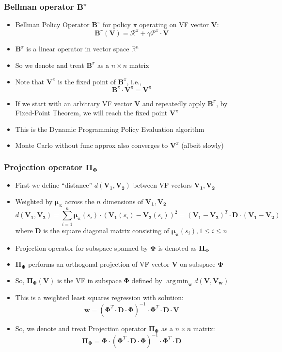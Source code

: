 \documentclass[handout]{beamer}
\newcommand{\vw}{\bm{V_w}}
\newcommand{\vpi}{\bm{V}^{\pi}}
\newcommand{\bphi}{\bm{\Phi}}
\newcommand{\bb}{\bm{B}^{\pi}}
\newcommand{\bpi}{\bm{\Pi_{\Phi}}}
\newcommand{\bmu}{\bm{\mu_{\pi}}}
\newcommand{\bv}{\bm{V}}
\newcommand{\bd}{\bm{D}}
\newcommand{\bw}{\bm{w}}
\DeclareMathOperator*{\argmin}{arg\,min}
\begin{document}
\begin{frame}
\frametitle{Bellman operator $\bb$}
\pause
\begin{itemize}[<+->]
\item Bellman Policy Operator $\bb$ for policy $\pi$ operating on VF vector $\bv$:
$$\bb (\bv) = \bm{\mathcal{R}}^{\pi} + \gamma \bm{\mathcal{P}}^{\pi} \cdot \bv$$
\item $\bb$ is a linear operator in vector space $\mathbb{R}^n$
\item So we denote and treat $\bb$ as a $n \times n$ matrix
\item Note that $\vpi$ is the fixed point of $\bb$, i.e.,
$$\bb \cdot \vpi = \vpi$$
\item If we start with an arbitrary VF vector $\bv$ and repeatedly apply $\bb$, 
by Fixed-Point Theorem, we will reach the fixed point $\vpi$
\item This is the Dynamic Programming Policy Evaluation algorithm
\item Monte Carlo without func approx also converges to $\vpi$ (albeit slowly)
\end{itemize}
\end{frame}

\begin{frame}
\frametitle{Projection operator $\bpi$}
\pause
\begin{itemize}[<+->]
\item First we define ``distance'' $d(\bm{V_1}, \bm{V_2})$ between VF vectors $\bm{V_1}, \bm{V_2}$
\item Weighted by $\bmu$ across the $n$ dimensions of $\bm{V_1}, \bm{V_2}$
$$d(\bm{V_1}, \bm{V_2}) = \sum_{i=1}^n \bmu(s_i) \cdot  (\bm{V_1}(s_i) - \bm{V_2}(s_i))^2 =  (\bm{V_1} - \bm{V_2})^T \cdot \bd \cdot (\bm{V_1} - \bm{V_2})$$
where $\bd$ is the square diagonal matrix consisting of $\bmu(s_i), 1 \leq i \leq n$
\item Projection operator for subspace spanned by $\bphi$ is denoted as $\bpi$
\item $\bpi$ performs an orthogonal projection of VF vector $\bv$ on subspace $\bphi$
\item So, $\bpi (\bv)$ is the VF in subspace $\bphi$ defined by $\argmin_{\bw} d(\bv, \vw)$
\item This is a weighted least squares regression with solution:
$$\bw = (\bphi^T \cdot \bd \cdot \bphi)^{-1} \cdot \bphi^T \cdot \bd \cdot \bv$$
\item So, we denote and treat Projection operator $\bpi$ as a $n \times n$ matrix:
$$\bpi = \bphi \cdot (\bphi^T \cdot \bd \cdot \bphi)^{-1} \cdot \bphi^T \cdot \bd$$
\end{itemize}
\end{frame}
\end{document}
